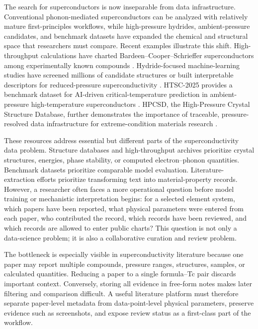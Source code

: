 \documentclass[11pt,a4paper]{article}
\begin{document}
The search for superconductors is now inseparable from data infrastructure. Conventional phonon-mediated superconductors can be analyzed with relatively mature first-principles workflows, while high-pressure hydrides, ambient-pressure candidates, and benchmark datasets have expanded the chemical and structural space that researchers must compare. Recent examples illustrate this shift. High-throughput calculations have charted Bardeen--Cooper--Schrieffer superconductors among experimentally known compounds \cite{bercx2025prxenergy}. Hydride-focused machine-learning studies have screened millions of candidate structures or built interpretable descriptors for reduced-pressure superconductivity \cite{pires2026ambient,chen2026descriptors}. HTSC-2025 provides a benchmark dataset for AI-driven critical-temperature prediction in ambient-pressure high-temperature superconductors \cite{han2025htsc}. HPCSD, the High-Pressure Crystal Structure Database, further demonstrates the importance of traceable, pressure-resolved data infrastructure for extreme-condition materials research \cite{wang2026hpcsd}.

These resources address essential but different parts of the superconductivity data problem. Structure databases and high-throughput archives prioritize crystal structures, energies, phase stability, or computed electron--phonon quantities. Benchmark datasets prioritize comparable model evaluation. Literature-extraction efforts prioritize transforming text into material-property records. However, a researcher often faces a more operational question before model training or mechanistic interpretation begins: for a selected element system, which papers have been reported, what physical parameters were entered from each paper, who contributed the record, which records have been reviewed, and which records are allowed to enter public charts? This question is not only a data-science problem; it is also a collaborative curation and review problem.

The bottleneck is especially visible in superconductivity literature because one paper may report multiple compounds, pressure ranges, structures, samples, or calculated quantities. Reducing a paper to a single formula--Tc pair discards important context. Conversely, storing all evidence in free-form notes makes later filtering and comparison difficult. A useful literature platform must therefore separate paper-level metadata from data-point-level physical parameters, preserve evidence such as screenshots, and expose review status as a first-class part of the workflow.
\end{document}

